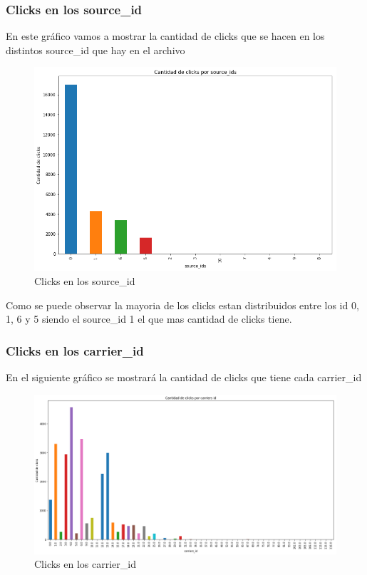 \documentclass[a4paper, 12pt]{article}
\newcommand\tab[1][1cm]{\hspace*{#1}}
\begin{document}
	\subsubsection{Clicks en los source\_id}
		\tab En este gráfico vamos a mostrar la cantidad de clicks que se hacen en los distintos source\_id que hay en el archivo
		
		
		\FloatBarrier
		\begin{figure}[h]
			\centering
			\includegraphics[width=\textwidth]{images/clicks/clicks_source_id.png}
			\caption{Clicks en los source\_id}
		\end{figure}
		\FloatBarrier

		\tab Como se puede observar la mayoria de los clicks estan distribuidos entre los id 0, 1, 6 y 5 siendo el source\_id 1 el que mas cantidad de clicks tiene.


	\subsubsection{Clicks en los carrier\_id}
		\tab En el siguiente gráfico se mostrará la cantidad de clicks que tiene cada carrier\_id
		
		\FloatBarrier
		\begin{figure}[h]
			\centering
			\includegraphics[width=\textwidth]{images/clicks/clicks_carrier_id.png}
			\caption{Clicks en los carrier\_id}
		\end{figure}
		\FloatBarrier
\end{document}

